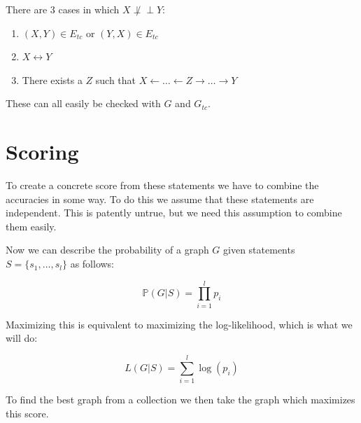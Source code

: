 \documentclass[11pt,a4paper]{report}
\theoremstyle{definition}
\def\ci{\perp\!\!\!\perp}
\begin{document}
There are 3 cases in which $X \not \ci Y$:
\begin{enumerate}
  \item $(X, Y) \in E_{tc}$ or $(Y, X) \in E_{tc}$

  \item $X \leftrightarrow Y$

  \item There exists a $Z$ such that $X \leftarrow \ldots \leftarrow Z
    \rightarrow \ldots \rightarrow Y$
\end{enumerate}
These can all easily be checked with $G$ and $G_{tc}$.

\section{Scoring}\label{sec:scoring}
To create a concrete score from these statements we have to combine the
accuracies in some way. To do this we assume that these statements are
independent. This is patently untrue, but we need this assumption to
combine them easily.

Now we can describe the probability of a graph $G$ given statements $S =
\{s_1, \ldots, s_l\}$ as follows:

\begin{equation*}
  \mathbb{P}(G | S) = \prod ^l_{i=1} p_i
\end{equation*}

Maximizing this is equivalent to maximizing the log-likelihood, which is
what we will do:

\begin{equation*}
  L(G|S) = \sum_{i=1}^l \log (p_i)
\end{equation*}

To find the best graph from a collection we then take the graph which
maximizes this score.
\end{document}
